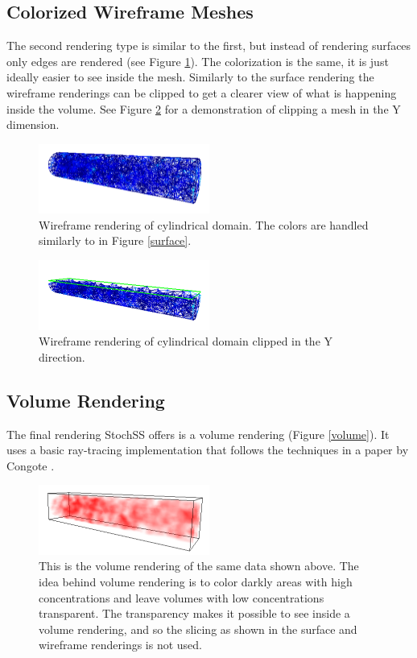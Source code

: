 \subsection{Colorized Wireframe Meshes}

The second rendering type is similar to the first, but instead of rendering surfaces only edges are rendered (see Figure \ref{wireframe}). The colorization is the same, it is just ideally easier to see inside the mesh. Similarly to the surface rendering the wireframe renderings can be clipped to get a clearer view of what is happening inside the volume. See Figure \ref{clipy} for a demonstration of clipping a mesh in the Y dimension.

\begin{figure}[!ht]
  \centering
    \includegraphics[width=0.5\textwidth]{wireframe}
  \caption{ Wireframe rendering of cylindrical domain. The colors are handled similarly to in Figure \ref{surface}. }
  \label{wireframe}
\end{figure}

\begin{figure}[!ht]
  \centering
    \includegraphics[width=0.5\textwidth]{clipy}
  \caption{ Wireframe rendering of cylindrical domain clipped in the Y direction. }
  \label{clipy}
\end{figure}

\subsection{Volume Rendering}

The final rendering StochSS offers is a volume rendering (Figure \ref{volume}). It uses a basic ray-tracing implementation that follows the techniques in a paper by Congote \cite{Congote:2011}.

\begin{figure}[!ht]
  \centering
    \includegraphics[width=0.5\textwidth]{volume}
  \caption{ This is the volume rendering of the same data shown above. The idea behind volume rendering is to color darkly areas with high concentrations and leave volumes with low concentrations transparent. The transparency makes it possible to see inside a volume rendering, and so the slicing as shown in the surface and wireframe renderings is not used. }
  \label{ volume }
\end{figure}
